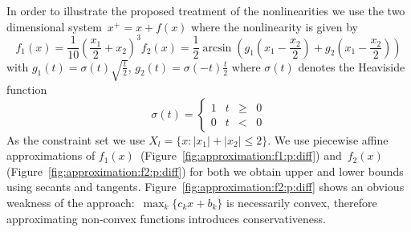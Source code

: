 \documentclass[a4paper, 12pt, twoside]{article}
\theoremstyle{definition}
\numberwithin{equation}{section}
\providecommand{\abs}[1]{\left|#1\right|}
\begin{document}
In order to illustrate the proposed treatment of the nonlinearities we use the two dimensional system~$x^+=x+f(x)$ where the nonlinearity is given by
%
\begin{subequations}
\begin{equation}
  f_1(x) = \frac{1}{10}\left(\frac{x_1}{2}+x_2\right)^3
\end{equation}
\begin{equation}
  f_2(x) = \frac{1}{2}\arcsin\left(g_1\left(x_1-\frac{x_2}{2}\right)+g_2\left(x_1-\frac{x_2}{2}\right) \right)
\end{equation}
\end{subequations}
%
with $g_1(t)=\sigma(t)\sqrt{\frac{t}{2}}$, $g_2(t)=\sigma(-t)\frac{t}{2}$ where $\sigma(t)$ denotes the Heaviside function
$$
  \sigma(t) = \left\{\begin{array}{crcl}1& t&\geq&0\\ 0 &t&<&0 \end{array}\right.
$$
%
As the constraint set we use $X_l = \{x:\abs{x_1}+\abs{x_2}\leq 2\}$.
%
We use piecewise affine approximations of $f_1(x)$~(Figure~\ref{fig:approximation:f1:p:diff}) and~$f_2(x)$ (Figure~\ref{fig:approximation:f2:p:diff})
for both we obtain upper and lower bounds using secants and tangents.
%
Figure~\ref{fig:approximation:f2:p:diff} shows an obvious weakness of the approach:~$\max_k\{c_k x+b_k\}$ is necessarily convex, therefore approximating non-convex functions introduces conservativeness.
\end{document}
